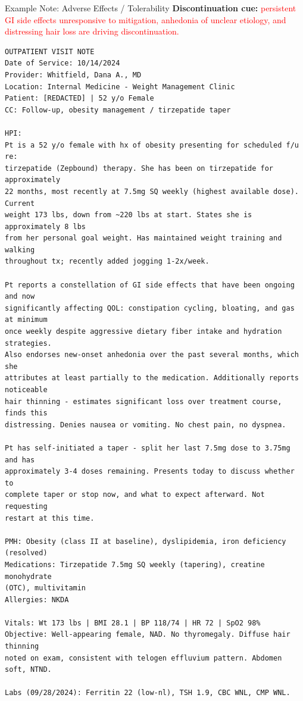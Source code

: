 \documentclass[aspectratio=169]{beamer}
\begin{document}
\begin{frame}{Example Note: Adverse Effects / Tolerability}
\tiny
\textbf{Discontinuation cue:}
\textcolor{red}{persistent GI side effects unresponsive to mitigation, anhedonia of unclear etiology, and distressing hair loss are driving discontinuation.}

\vspace{0.5em}
\begin{verbatim}
OUTPATIENT VISIT NOTE
Date of Service: 10/14/2024
Provider: Whitfield, Dana A., MD
Location: Internal Medicine - Weight Management Clinic
Patient: [REDACTED] | 52 y/o Female
CC: Follow-up, obesity management / tirzepatide taper

HPI:
Pt is a 52 y/o female with hx of obesity presenting for scheduled f/u re:
tirzepatide (Zepbound) therapy. She has been on tirzepatide for approximately
22 months, most recently at 7.5mg SQ weekly (highest available dose). Current
weight 173 lbs, down from ~220 lbs at start. States she is approximately 8 lbs
from her personal goal weight. Has maintained weight training and walking
throughout tx; recently added jogging 1-2x/week.

Pt reports a constellation of GI side effects that have been ongoing and now
significantly affecting QOL: constipation cycling, bloating, and gas at minimum
once weekly despite aggressive dietary fiber intake and hydration strategies.
Also endorses new-onset anhedonia over the past several months, which she
attributes at least partially to the medication. Additionally reports noticeable
hair thinning - estimates significant loss over treatment course, finds this
distressing. Denies nausea or vomiting. No chest pain, no dyspnea.

Pt has self-initiated a taper - split her last 7.5mg dose to 3.75mg and has
approximately 3-4 doses remaining. Presents today to discuss whether to
complete taper or stop now, and what to expect afterward. Not requesting
restart at this time.

PMH: Obesity (class II at baseline), dyslipidemia, iron deficiency (resolved)
Medications: Tirzepatide 7.5mg SQ weekly (tapering), creatine monohydrate
(OTC), multivitamin
Allergies: NKDA

Vitals: Wt 173 lbs | BMI 28.1 | BP 118/74 | HR 72 | SpO2 98%
Objective: Well-appearing female, NAD. No thyromegaly. Diffuse hair thinning
noted on exam, consistent with telogen effluvium pattern. Abdomen soft, NTND.

Labs (09/28/2024): Ferritin 22 (low-nl), TSH 1.9, CBC WNL, CMP WNL.


\end{verbatim}
\end{frame}
\end{document}
